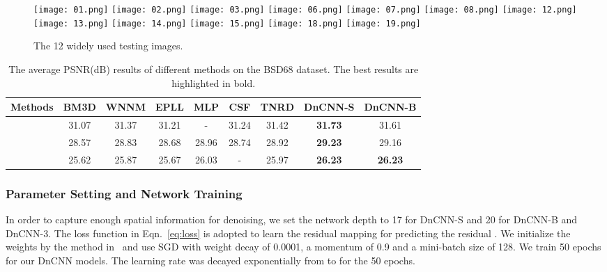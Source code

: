 \documentclass[journal]{IEEEtran}
\begin{document}
\begin{figure*}[!htbp]
\begin{center}
\subfigure
{\texttt{[image: 01.png]}}
\subfigure
{\texttt{[image: 02.png]}}
\subfigure
{\texttt{[image: 03.png]}}
\subfigure
{\texttt{[image: 06.png]}}
\subfigure
{\texttt{[image: 07.png]}}
\subfigure
{\texttt{[image: 08.png]}}
\subfigure
{\texttt{[image: 12.png]}}
\subfigure
{\texttt{[image: 13.png]}}
\subfigure
{\texttt{[image: 14.png]}}
\subfigure
{\texttt{[image: 15.png]}}
\subfigure
{\texttt{[image: 18.png]}}
\subfigure
{\texttt{[image: 19.png]}}
\caption{The 12 widely used testing images.}\label{fig111}
\end{center}
\end{figure*}



\begin{table*}[!htbp]
\caption{The average PSNR(dB) results of different methods on the BSD68 dataset. The best results are highlighted in bold.}
\center
\begin{tabular}{|c|c|c|c|c|c|c|c|c|}
  \hline
  Methods & \;BM3D\;&  \;WNNM\;&\; EPLL\;& \;MLP\;  & \;CSF\; & \;TNRD\; & \;DnCNN-S\; & \;DnCNN-B\;\\ \hline
   & 31.07 &   31.37&31.21 & -  & 31.24 & 31.42 & \textbf{31.73}   &31.61\\\hline
   & 28.57 &  28.83 &28.68 & 28.96 &  28.74 & 28.92 & \textbf{29.23}& 29.16\\\hline
   & 25.62 &  25.87 &25.67 & 26.03 &  - & 25.97 & \textbf{26.23} &\textbf{26.23}\\
  \hline
\end{tabular}
\label{table1}
\end{table*}



\subsubsection{Parameter Setting and Network Training}

In order to capture enough spatial information for denoising, we set the network depth to 17 for DnCNN-S and 20 for DnCNN-B and DnCNN-3. The loss function in Eqn.~\eqref{eq:loss} is adopted to learn the residual mapping  for predicting the residual .
We initialize the weights by the method in~\cite{he2015delving} and use SGD with weight decay of 0.0001, a momentum of 0.9 and a mini-batch size of 128.
We train 50 epochs for our DnCNN models.
The learning rate was decayed exponentially from  to  for the 50 epochs.
\end{document}
